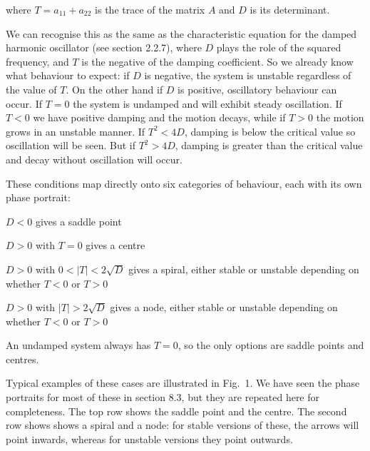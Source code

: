   \noindent{}where $T=a_{11}+a_{22}$ is the trace of the matrix $A$ and $D$ is 
  its determinant. 

  We can recognise this as the same as the characteristic equation for the 
  damped harmonic oscillator (see section 2.2.7), where $D$ plays the role of 
  the squared frequency, and $T$ is the negative of the damping coefficient. So 
  we already know what behaviour to expect: if $D$ is negative, the system is 
  unstable regardless of the value of $T$. On the other hand if $D$ is 
  positive, oscillatory behaviour can occur. If $T=0$ the system is undamped 
  and will exhibit steady oscillation. If $T<0$ we have positive damping and 
  the motion decays, while if $T>0$ the motion grows in an unstable manner. If 
  $T^2 < 4D$, damping is below the critical value so oscillation will be seen. 
  But if $T^2 > 4D$, damping is greater than the critical value and decay 
  without oscillation will occur. 

  These conditions map directly onto six categories of behaviour, each with its 
  own phase portrait: 

  $D<0$ gives a saddle point 

  $D>0$ with $T=0$ gives a centre 

  $D>0$ with $0 < |T| < 2\sqrt{D}$ gives a spiral, either stable or unstable 
  depending on whether $T<0$ or $T>0$ 

  $D>0$ with $|T| > 2\sqrt{D}$ gives a node, either stable or unstable 
  depending on whether $T<0$ or $T>0$ 

  An undamped system always has $T=0$, so the only options are saddle points 
  and centres. 

  Typical examples of these cases are illustrated in Fig.\ 1. We have seen the 
  phase portraits for most of these in section 8.3, but they are repeated here 
  for completeness. The top row shows the saddle point and the centre. The 
  second row shows shows a spiral and a node: for stable versions of these, the 
  arrows will point inwards, whereas for unstable versions they point outwards. 




